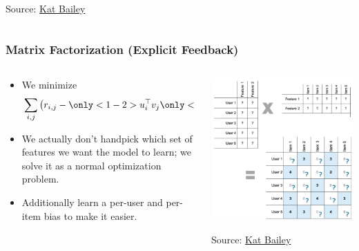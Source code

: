 \documentclass[11pt]{beamer}
\begin{document}
\begin{frame}
\begin{columns}
\begin{column}{0.4\textwidth}
\begin{center}
					{\tiny Source: \href{https://katbailey.github.io/post/matrix-factorization-with-tensorflow/}{\color{blue} Kat Bailey}}
				\end{center}
			\end{column}
		\end{columns}
	\end{frame}

	\begin{frame}
		\frametitle{Matrix Factorization (Explicit Feedback)}
		\begin{columns}
			\begin{column}{0.6\textwidth}
				\begin{itemize}
					\item<1-> We minimize
					$$
					\sum_{i,j}\left(r_{i,j} -
					\only<1-2>{u_i^\top v_j}%
					\only<3->{\alert<3>{
					\left(u_i^\top v_j + b_{u_i} + b_{u_j}\right)
					}}\right)^2
					$$
					\item<2-> We actually don't handpick which set of features we want the model to learn; we solve it as a normal optimization problem.
					\item<3-> Additionally learn a per-user and per-item bias to make it easier.
				\end{itemize}
			\end{column}
			\begin{column}{0.4\textwidth}
				\begin{center}
					\centering
					\includegraphics[width=\textwidth]{images/matrix_factorization.png}
					
					{\tiny Source: \href{https://katbailey.github.io/post/matrix-factorization-with-tensorflow/}{\color{blue} Kat Bailey}}
				\end{center}
			\end{column}
		\end{columns}
	\end{frame}
\end{document}
